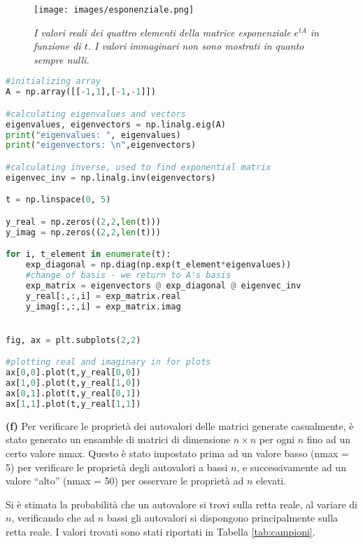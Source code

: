 \documentclass{article}
\begin{document}
\begin{figure}
     \centering
     \texttt{[image: images/esponenziale.png]}
     \caption{\emph{I valori reali dei quattro elementi della matrice esponenziale $e^{tA}$ in funzione di $t$. I valori immaginari non sono mostrati in quanto sempre nulli.}}
     \label{fig:exponential}
\end{figure}

\begin{lstlisting}[language = Python]
#initializing array
A = np.array([[-1,1],[-1,-1]])

#calculating eigenvalues and vectors
eigenvalues, eigenvectors = np.linalg.eig(A)
print("eigenvalues: ", eigenvalues)
print("eigenvectors: \n",eigenvectors)

#calculating inverse, used to find exponential matrix
eigenvec_inv = np.linalg.inv(eigenvectors)

t = np.linspace(0, 5)

y_real = np.zeros((2,2,len(t)))
y_imag = np.zeros((2,2,len(t)))

for i, t_element in enumerate(t):
    exp_diagonal = np.diag(np.exp(t_element*eigenvalues))
    #change of basis - we return to A's basis
    exp_matrix = eigenvectors @ exp_diagonal @ eigenvec_inv
    y_real[:,:,i] = exp_matrix.real
    y_imag[:,:,i] = exp_matrix.imag


fig, ax = plt.subplots(2,2)

#plotting real and imaginary in for plots
ax[0,0].plot(t,y_real[0,0])
ax[1,0].plot(t,y_real[1,0])
ax[0,1].plot(t,y_real[0,1])
ax[1,1].plot(t,y_real[1,1])


\end{lstlisting}

\textbf{(f)}
Per verificare le proprietà dei autovalori delle matrici generate casualmente, è stato generato un ensamble di matrici di dimensione $n \times n$ per ogni $n$ fino ad un certo valore nmax. Questo è stato impostato prima ad un valore basso (nmax = 5) per verificare le proprietà degli autovalori a bassi $n$, e successivamente ad un valore ``alto'' (nmax = 50) per osservare le proprietà ad $n$ elevati.

 Si è stimata la probabilità che un autovalore si trovi sulla retta reale, al variare di $n$, verificando che ad $n$ bassi gli autovalori si dispongono principalmente sulla retta reale. I valori trovati sono stati riportati in Tabella \ref{tab:campioni}.
\end{document}
